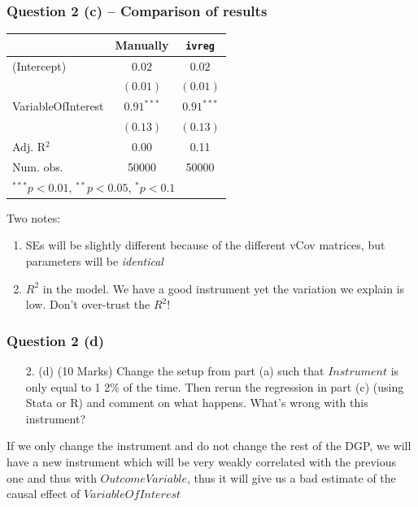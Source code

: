 \documentclass[xcolor=table,dvipsnames]{beamer}
\begin{document}
\begin{frame}[fragile]
\frametitle{Question 2 (c) -- Comparison of results}
\begin{table}
\begin{center}
\begin{tabular}{l c c }
\hline
 & Manually & \texttt{ivreg} \\
\hline
(Intercept)        & $0.02$       & $0.02$       \\
                   & $(0.01)$     & $(0.01)$     \\
VariableOfInterest & $0.91^{***}$ & $0.91^{***}$ \\
                   & $(0.13)$     & $(0.13)$     \\
\hline
Adj. R$^2$         & 0.00         & 0.11         \\
Num. obs.          & 50000        & 50000        \\
\hline
\multicolumn{3}{l}{\scriptsize{$^{***}p<0.01$, $^{**}p<0.05$, $^*p<0.1$}}
\end{tabular}
\end{center}
\end{table} \pause
Two notes: \pause
\begin{enumerate}
\item SEs will be slightly different because of the different vCov matrices, but parameters will be \emph{identical} \pause
\item $R^{2}$ in the  model. We have a good instrument yet the variation we explain is low. \pause Don't over-trust the $R^{2}$!
\end{enumerate}
\end{frame}

\begin{frame}[fragile]
\frametitle{Question 2 (d)}
\begin{enumerate}
\item[2.] (d) (10 Marks) Change the setup from part (a) such that $Instrument$ is only equal to 1 2\% of the time. Then rerun the regression in part (c) (using Stata or R) and comment on what happens. What's wrong with this instrument?
\end{enumerate} \pause

If we only change the instrument and do not change the rest of the DGP, we will have a new instrument which will be very weakly correlated with the previous one and thus with $OutcomeVariable$, thus it will give us a bad estimate of the causal effect of $VariableOfInterest$
\end{frame}
\end{document}
